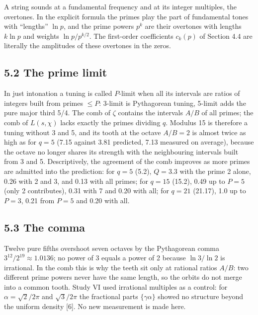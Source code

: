 \documentclass[
  10pt,
]{article}
\begin{document}
A string sounds at a fundamental frequency and at its integer multiples,
the overtones. In the explicit formula the primes play the part of
fundamental tones with ``lengths'' \(\ln p\), and the prime powers
\(p^k\) are their overtones with lengths \(k\ln p\) and weights
\(\ln p/p^{k/2}\). The first-order coefficients \(c_k(p)\) of Section
4.4 are literally the amplitudes of these overtones in the zeros.

\hypertarget{the-prime-limit}{%
\subsection{5.2 The prime limit}\label{the-prime-limit}}

In just intonation a tuning is called \(P\)-limit when all its intervals
are ratios of integers built from primes \(\le P\): 3-limit is
Pythagorean tuning, 5-limit adds the pure major third 5/4. The comb of
\(\zeta\) contains the intervals \(A/B\) of all primes; the comb of
\(L(s, \chi)\) lacks exactly the primes dividing \(q\). Modulus 15 is
therefore a tuning without 3 and 5, and its tooth at the octave
\(A/B = 2\) is almost twice as high as for \(q = 5\) (7.15 against 3.81
predicted, 7.13 measured on average), because the octave no longer
shares its strength with the neighbouring intervals built from 3 and 5.
Descriptively, the agreement of the comb improves as more primes are
admitted into the prediction: for \(q = 5\) (5.2), \(Q = 3.3\) with the
prime 2 alone, 0.26 with 2 and 3, and 0.13 with all primes; for
\(q = 15\) (15.2), 0.49 up to \(P = 5\) (only 2 contributes), 0.31 with
7 and 0.20 with all; for \(q = 21\) (21.17), 1.0 up to \(P = 3\), 0.21
from \(P = 5\) and 0.20 with all.

\hypertarget{the-comma}{%
\subsection{5.3 The comma}\label{the-comma}}

Twelve pure fifths overshoot seven octaves by the Pythagorean comma
\(3^{12}/2^{19} \approx 1.0136\); no power of 3 equals a power of 2
because \(\ln 3/\ln 2\) is irrational. In the comb this is why the teeth
sit only at rational ratios \(A/B\): two different prime powers never
have the same length, so the orbits do not merge into a common tooth.
Study VI used irrational multiples as a control: for
\(\alpha = \sqrt2/2\pi\) and \(\sqrt3/2\pi\) the fractional parts
\(\{\gamma\alpha\}\) showed no structure beyond the uniform density
{[}6{]}. No new measurement is made here.
\end{document}
